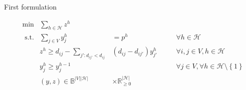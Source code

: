 \documentclass[utf8,aspectratio=1610,ngerman,english]{beamer}
\newcommand{\inH}{h \in \mathcal H}
\begin{document}
\begin{frame}{First formulation}
\begin{minipage}[t]{0.59\linewidth}
\begin{block}
\begin{subequations}
\begin{alignat}{4}
                     & \min         & \sum_{\inH}z^{h}                               &                                           &  &  &                                                             \\
                     & \text{ s.t.} & \sum_{j \in V}y_{j}^h                          & =     p^{h}                               &  &  & \forall \inH                                                \\
                     &              & z^{h} \geq d_{ij} - \sum_{j':d_{ij'} < d_{ij}} & (d_{ij} - d_{ij'})y_{j'}^h \;             &  &  & \forall i,j \in V, h \in \mathcal H                         \\
                     &              & y_{j}^h \geq  y_j^{h-1}                        &                                           &  &  & \forall j \in V, \forall \inH \setminus \left \{1 \right \} \\
                     &              & (y,z) \in \mathbb B^{|V||\mathcal H|}          & \times \mathbb{R}_{\geq 0}^{|\mathcal H|} &  &  &
                \end{alignat}
            \end{subequations}
            \vspace{-9pt}
        \end{block}
    \end{minipage}
\end{frame}
\end{document}
